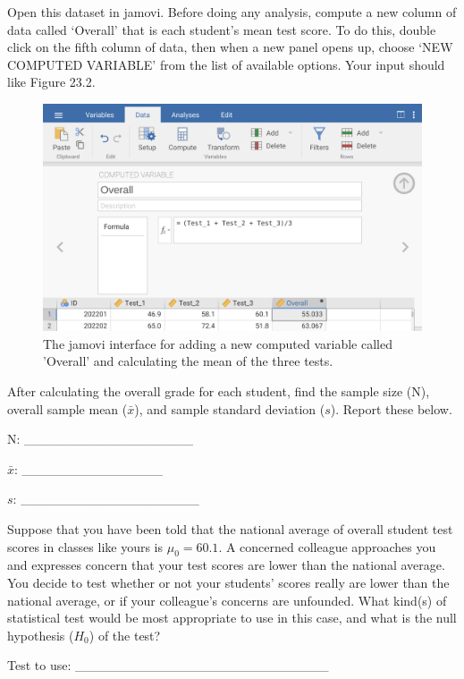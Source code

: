 \documentclass[
]{scrbook}
\begin{document}
Open this dataset in jamovi.
Before doing any analysis, compute a new column of data called `Overall' that is each student's mean test score.
To do this, double click on the fifth column of data, then when a new panel opens up, choose `NEW COMPUTED VARIABLE' from the list of available options.
Your input should like Figure 23.2.

\begin{figure}
\includegraphics[width=1\linewidth]{img/jamovi_students_overall} \caption{The jamovi interface for adding a new computed variable called 'Overall' and calculating the mean of the three tests.}\label{fig:unnamed-chunk-102}
\end{figure}

After calculating the overall grade for each student, find the sample size (N), overall sample mean (\(\bar{x}\)), and sample standard deviation (\(s\)).
Report these below.

N: \_\_\_\_\_\_\_\_\_\_\_\_\_\_\_\_\_\_

\(\bar{x}\): \_\_\_\_\_\_\_\_\_\_\_\_\_\_\_

\(s\): \_\_\_\_\_\_\_\_\_\_\_\_\_\_\_\_\_\_\_

Suppose that you have been told that the national average of overall student test scores in classes like yours is \(\mu_{0} = 60.1\).
A concerned colleague approaches you and expresses concern that your test scores are lower than the national average.
You decide to test whether or not your students' scores really are lower than the national average, or if your colleague's concerns are unfounded.
What kind(s) of statistical test would be most appropriate to use in this case, and what is the null hypothesis (\(H_{0}\)) of the test?

Test to use: \_\_\_\_\_\_\_\_\_\_\_\_\_\_\_\_\_\_\_\_\_\_\_\_\_\_\_
\end{document}
